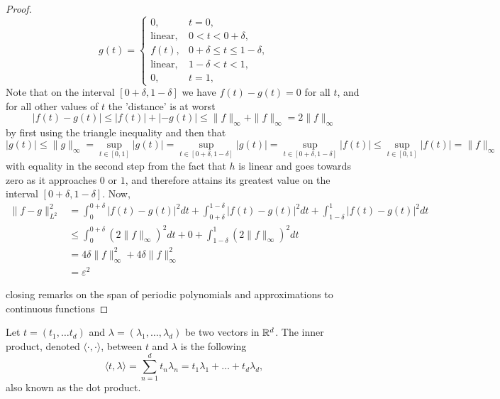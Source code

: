 \documentclass[../thesis.tex]{subfiles}
\begin{document}
\begin{proof}
\begin{equation*}
    g(t) = 
    \begin{cases} 0, &  t=0,\\  
        \text{linear}, &  0<t<0+\delta,\\ 
        f(t), & 0+\delta \leq t \leq 1-\delta,\\ 
        \text{linear}, &  1-\delta <t<1,\\ 
        0, &  t=1,
    \end{cases}
\end{equation*}
Note that on the interval $[0+\delta, 1-\delta]$ we have $f(t)-g(t)= 0$ for all $t$, and for all other values of $t$ the 'distance' is at worst 
\begin{equation*}
    \left|f(t)-g(t) \right| \leq |f(t)| + |-g(t)| \leq \|f \|_{\infty} + \|f \|_{\infty} = 2 \|f \|_{\infty}
\end{equation*}
by first using the triangle inequality and then that
\begin{equation*}
    |g(t)| \leq \|g\|_{\infty} = \sup_{t\in[0,1]} |g(t)| = \sup_{t\in[0+\delta, 1-\delta]} |g(t)| = \sup_{t\in[0+\delta, 1-\delta]} |f(t)| \leq \sup_{t\in[0, 1]} |f(t)| =\| f\|_{\infty}
\end{equation*}
with equality in the second step from the fact that $h$ is linear and goes towards zero as it approaches $0$ or $1$, and therefore attains its greatest value on the interval $[0+\delta,1-\delta]$. Now,
\begin{align*}
    \| f-g \|_{L^2}^2 &=  \int_0^{0+\delta} \left|f(t)-g(t) \right|^2dt + \int_{0+\delta}^{1-\delta} \left|f(t)-g(t) \right|^2dt +\int_{1-\delta}^{1} \left|f(t)-g(t) \right|^2dt\\ 
    &\leq \int_0^{0+\delta} (2 \| f\|_\infty)^2dt + 0 +\int_{1-\delta}^{1} (2 \| f\|_\infty)^2dt\\
    &=  4 \delta \| f\|_\infty^2 + 4 \delta \| f\|_\infty^2\\ 
    &= \varepsilon^2
\end{align*}

closing remarks on the span of periodic polynomials and approximations to continuous functions
\end{proof}



\begin{definition}\label{def:dot_prod}
    Let $t=(t_1,\dots t_d)$ and $\lambda=(\lambda_1, \dots, \lambda_d)$ be two vectors in $\mathbb{R}^d$. The inner product, denoted $\langle \cdot, \cdot \rangle$, between $t$ and $\lambda$ is the following 
    \begin{equation*}
        \langle t, \lambda \rangle = \sum_{n=1}^d t_n \lambda_n = t_1\lambda_1 + \dots + t_d\lambda_d,
    \end{equation*}
    also known as the dot product. 
\end{definition}
\end{document}
